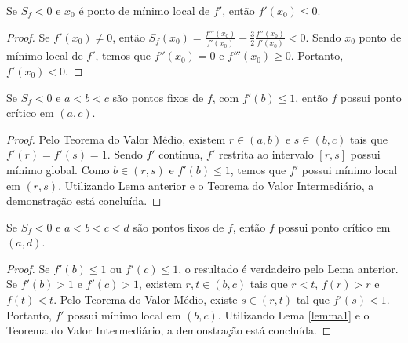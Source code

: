 \begin{lemma}
\label{lemma1}
Se $S_f < 0$ e $x_0$ é ponto de mínimo local de $f'$, então $f'(x_0) \leq 0$.
\end{lemma}

\begin{proof}
Se $f'(x_0) \neq 0$, então $S_f(x_0) = \frac{f'''(x_0)}{f'(x_0)} - \frac{3}{2} \frac{f''(x_0)}{f'(x_0)} < 0$. Sendo $x_0$ ponto de mínimo local de $f'$, temos que $f''(x_0) = 0$ e $f'''(x_0) \geq 0$. Portanto,  $f'(x_0) < 0$. 
\end{proof}

\begin{lemma}
\label{lemma2}
Se $S_f < 0$ e $a<b<c$ são pontos fixos de $f$, com $f'(b) \leq 1$, então $f$ possui ponto crítico em $(a, c)$.
\end{lemma}

\begin{proof}
Pelo Teorema do Valor Médio, existem $r \in (a,b)$ e $s \in (b,c)$  tais que $f'(r) = f'(s) = 1$. Sendo $f'$ contínua, $f'$ restrita ao intervalo $[r,s]$ possui mínimo global. Como $b \in (r,s)$ e $f'(b) \leq 1$, temos que $f'$ possui mínimo local em $(r,s)$. Utilizando Lema anterior e o Teorema do Valor Intermediário, a demonstração está concluída.
\end{proof}

\begin{lemma}
\label{lemma3}
Se $S_f < 0$ e $a<b<c<d$ são pontos fixos de $f$, então $f$ possui ponto crítico em $(a,d)$.
\end{lemma}

\begin{proof}
Se $f'(b) \leq 1$ ou $f'(c) \leq 1$, o resultado é verdadeiro pelo Lema anterior. Se $f'(b) > 1$ e $f'(c) > 1$, existem $r, t \in (b,c)$ tais que $r<t$, $f(r) > r$ e $f(t) < t$. Pelo Teorema do Valor Médio, existe $s \in (r,t)$ tal que $f'(s) < 1$. Portanto, $f'$ possui mínimo local em $(b,c)$. Utilizando Lema \ref{lemma1} e o Teorema do Valor Intermediário, a demonstração está concluída.
\end{proof}

